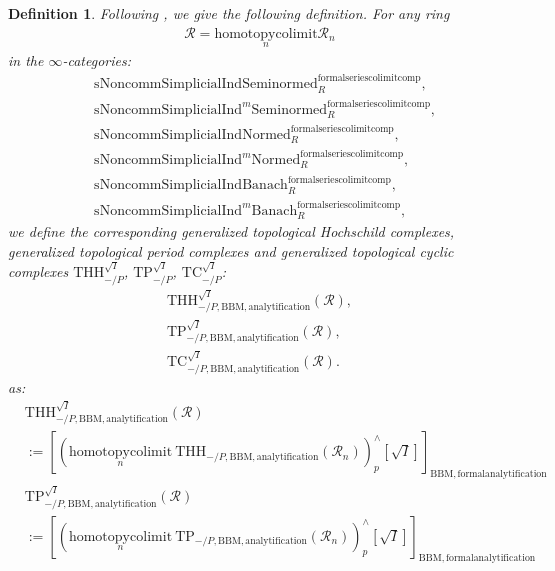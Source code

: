 \documentclass[12pt]{book}
\newtheorem{definition}{Definition}
\begin{document}
\begin{definition}
Following \cite{BS}, we give the following definition. For any ring
\begin{align}
\mathcal{R}=\underset{n}{\mathrm{homotopycolimit}}\mathcal{R}_n	
\end{align}
in the $\infty$-categories:
\begin{align}
&\mathrm{sNoncomm}\mathrm{Simplicial}\mathrm{Ind}\mathrm{Seminormed}^\mathrm{formalseriescolimitcomp}_R,\\
&\mathrm{sNoncomm}\mathrm{Simplicial}\mathrm{Ind}^m\mathrm{Seminormed}^\mathrm{formalseriescolimitcomp}_R,\\
&\mathrm{sNoncomm}\mathrm{Simplicial}\mathrm{Ind}\mathrm{Normed}^\mathrm{formalseriescolimitcomp}_R,\\
&\mathrm{sNoncomm}\mathrm{Simplicial}\mathrm{Ind}^m\mathrm{Normed}^\mathrm{formalseriescolimitcomp}_R,\\
&\mathrm{sNoncomm}\mathrm{Simplicial}\mathrm{Ind}\mathrm{Banach}^\mathrm{formalseriescolimitcomp}_R,\\
&\mathrm{sNoncomm}\mathrm{Simplicial}\mathrm{Ind}^m\mathrm{Banach}^\mathrm{formalseriescolimitcomp}_R,	
\end{align}	
we define the corresponding generalized topological Hochschild complexes, generalized topological period complexes and generalized topological cyclic complexes $\mathrm{THH}^{\sqrt{I}}_{-/P}$, $\mathrm{TP}^{\sqrt{I}}_{-/P}$, $\mathrm{TC}^{\sqrt{I}}_{-/P}$:
\begin{align}
 \mathrm{THH}^{\sqrt{I}}_{-/P,\mathrm{BBM},\mathrm{analytification}}(\mathcal{R}),\\
 \mathrm{TP}^{\sqrt{I}}_{-/P,\mathrm{BBM},\mathrm{analytification}}(\mathcal{R}),\\
 \mathrm{TC}^{\sqrt{I}}_{-/P,\mathrm{BBM},\mathrm{analytification}}(\mathcal{R}). 
\end{align}
as:
\begin{align}
& \mathrm{THH}^{\sqrt{I}}_{-/P,\mathrm{BBM},\mathrm{analytification}}(\mathcal{R})\\
&:=[(\underset{n}{\mathrm{homotopycolimit}}~  \mathrm{THH}_{-/P,\mathrm{BBM},\mathrm{analytification}}(\mathcal{R}_n))^\wedge_{p}[{\sqrt{I}}]]_{\mathrm{BBM},\mathrm{formalanalytification}}\\
& \mathrm{TP}^{\sqrt{I}}_{-/P,\mathrm{BBM},\mathrm{analytification}}(\mathcal{R})\\
&:=[(\underset{n}{\mathrm{homotopycolimit}}~  \mathrm{TP}_{-/P,\mathrm{BBM},\mathrm{analytification}}(\mathcal{R}_n))^\wedge_{p}[{\sqrt{I}}]]_{\mathrm{BBM},\mathrm{formalanalytification}}\\

\end{align}
\end{definition}
\end{document}
